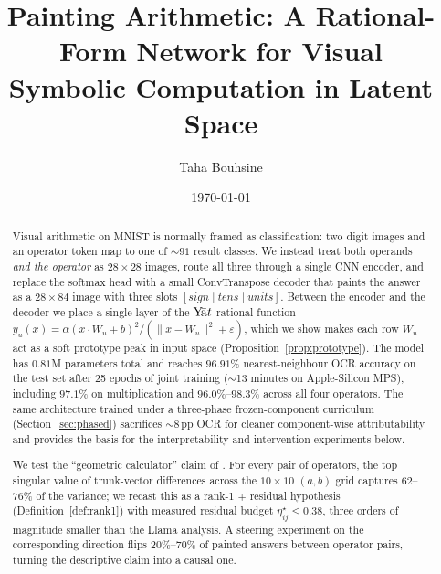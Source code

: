 \documentclass[11pt]{article}
\title{Painting Arithmetic: A Rational-Form Network for Visual\\
Symbolic Computation in Latent Space}
\author{Taha Bouhsine}
\date{\today}
\theoremstyle{papsty}
\newcommand{\yat}{$\textnormal{Y}\!\bar{\text{a}}t$}
\begin{document}
\maketitle

\begin{abstract}
Visual arithmetic on MNIST is normally framed as classification: two digit
images and an operator token map to one of $\sim 91$ result classes.
We instead treat both operands \emph{and the operator} as $28\!\times\!28$
images, route all three through a single CNN encoder, and replace the
softmax head with a small ConvTranspose decoder that paints the answer as
a $28\!\times\!84$ image with three slots $[\textit{sign} \mid
\textit{tens} \mid \textit{units}]$.
Between the encoder and the decoder we place a single layer of the
\yat{} rational function
$y_u(x) = \alpha(x\!\cdot\!W_u + b)^{2} / (\lVert x - W_u \rVert^{2} + \varepsilon)$,
which we show makes each row $W_u$ act as a soft prototype peak in input
space (Proposition~\ref{prop:prototype}).
The model has $0.81$M parameters total and reaches $96.91\%$
nearest-neighbour OCR accuracy on the test set after 25 epochs of joint
training ($\sim$13 minutes on Apple-Silicon MPS),
including $97.1\%$ on multiplication and $96.0\%$--$98.3\%$ across all
four operators. The same architecture trained under a three-phase
frozen-component curriculum (Section~\ref{sec:phased}) sacrifices $\sim 8$\,pp
OCR for cleaner component-wise attributability and provides the basis for
the interpretability and intervention experiments below.

We test the ``geometric calculator'' claim of \citet{goodfire2025geometric}.
For every pair of operators, the top singular value of trunk-vector
differences across the $10\!\times\!10$ $(a, b)$ grid captures $62$--$76\%$
of the variance; we recast this as a rank-1 + residual hypothesis
(Definition~\ref{def:rank1}) with measured residual budget
$\eta^\star_{ij} \le 0.38$, three orders of magnitude smaller than the
Llama analysis. A steering experiment on the corresponding direction
flips $20\%$--$70\%$ of painted answers between operator pairs,
turning the descriptive claim into a causal one.


\end{abstract}
\end{document}
